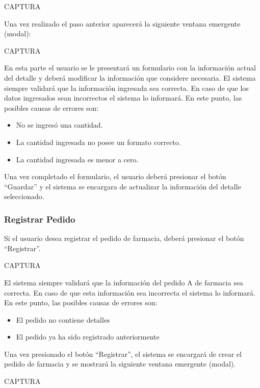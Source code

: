 \documentclass[letterpaper,10pt,spanish]{sphinxmanual}
\begin{document}
CAPTURA

Una vez realizado el paso anterior aparecerá la siguiente ventana emergente (modal):

CAPTURA

En esta parte el usuario se le presentará un formulario con la información actual del detalle y deberá modificar la información que considere necesaria.
El sistema siempre validará que la información ingresada sea correcta. En caso de que los datos ingresados sean incorrectos el sistema lo informará.
En este punto, las posibles causas de errores son:
\begin{itemize}
\item {} 
No se ingresó una cantidad.

\item {} 
La cantidad ingresada no posee un formato correcto.

\item {} 
La cantidad ingresada es menor a cero.

\end{itemize}

Una vez completado el formulario, el usuario deberá presionar el botón “Guardar” y el sistema se encargara de actualizar la información del detalle seleccionado.


\subsubsection{Registrar Pedido}
\label{pedidosfarmacia:registrar-pedido}
Si el usuario desea registrar el pedido de farmacia, deberá presionar el botón “Registrar”.

CAPTURA

El sistema siempre validará que la información del pedido A de farmacia sea correcta. En caso de que esta información sea incorrecta el sistema lo informará.
En este punto, las posibles causas de errores son:
\begin{itemize}
\item {} 
El pedido no contiene detalles

\item {} 
El pedido ya ha sido registrado anteriormente

\end{itemize}

Una vez presionado el botón “Registrar”, el sistema se encargará de crear el pedido de farmacia y se mostrará la siguiente ventana emergente (modal).

CAPTURA
\end{document}

